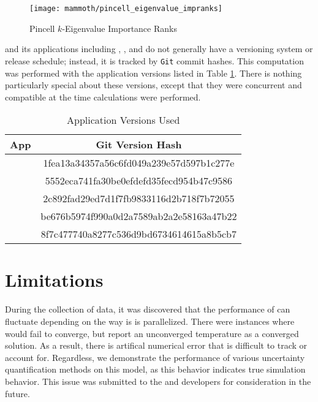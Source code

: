 \begin{figure}
  \centering
  \texttt{[image: mammoth/pincell\_eigenvalue\_impranks]}
  \caption{Pincell $k$-Eigenvalue Importance Ranks}
  \label{fig:pincell impranks}
\end{figure}

\moose{} and its applications including \rattlesnake{}, \bison{}, and \mammoth{} do not generally have a
versioning system or release
schedule; instead, it is tracked by \texttt{Git} \cite{git} commit hashes.
This computation was performed with the application versions listed in Table \ref{tab:git}.  There is nothing
particularly special about these versions, except that they were concurrent and compatible at the time
calculations were performed.
\begin{table}
  \centering
  \begin{tabular}{c c}
    App & Git Version Hash \\ \hline
    \moose{ } & 1fea13a34357a56c6fd049a239e57d597b1c277e\\
    \bison{ } & 5552eca741fa30be0efdefd35fecd954b47c9586\\
    \rattlesnake{ } & 2c892fad29ed7d1f7fb9833116d2b718f7b72055\\
    \mammoth{ } & be676b5974f990a0d2a7589ab2a2e58163a47b22 \\ \hline
    \raven{ } & 8f7c477740a8277c536d9bd6734614615a8b5cb7
  \end{tabular}
  \caption{Application Versions Used}
  \label{tab:git}
\end{table}

\section{Limitations}
During the collection of data, it was discovered that the performance of \bison{} can fluctuate depending on
the way is is parallelized.  There were instances where \bison{} would fail to converge, but report an unconverged
temperature as a converged solution.  As a result, there is artifical numerical error that is difficult to track or
account for.  Regardless, we demonstrate the performance of various uncertainty quantification methods on this model, 
as this behavior indicates true simulation behavior.  This issue was submitted to the \bison{} and \mammoth{}
developers for consideration in the future.

